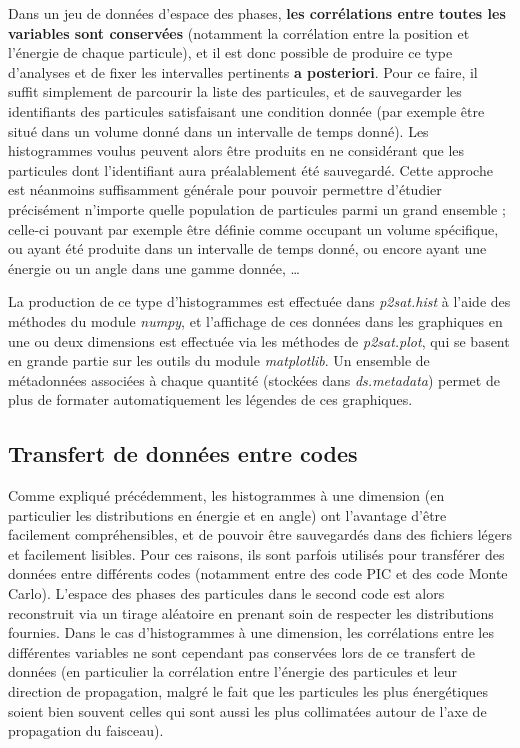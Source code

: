 \begin{refsection}
Dans un jeu de données d'espace des phases, \textbf{les corrélations entre toutes les variables sont conservées} (notamment la corrélation entre la position et l'énergie de chaque particule), et il est donc possible de produire ce type d'analyses et de fixer les intervalles pertinents \textbf{a posteriori}. Pour ce faire, il suffit simplement de parcourir la liste des particules, et de sauvegarder les identifiants des particules satisfaisant une condition donnée (par exemple être situé dans un volume donné dans un intervalle de temps donné). Les histogrammes voulus peuvent alors être produits en ne considérant que les particules dont l'identifiant aura préalablement été sauvegardé. Cette approche est néanmoins suffisamment générale pour pouvoir permettre d'étudier précisément n'importe quelle population de particules parmi un grand ensemble ; celle-ci pouvant par exemple être définie comme occupant un volume spécifique, ou ayant été produite dans un intervalle de temps donné, ou encore ayant une énergie ou un angle dans une gamme donnée, … 

La production de ce type d'histogrammes est effectuée dans \textit{p2sat.hist} à l'aide des méthodes du module \textit{numpy}, et l'affichage de ces données dans les graphiques en une ou deux dimensions est effectuée via les méthodes de \textit{p2sat.plot}, qui se basent en grande partie sur les outils du module \textit{matplotlib}. Un ensemble de métadonnées associées à chaque quantité (stockées dans \textit{ds.metadata}) permet de plus de formater automatiquement les légendes de ces graphiques.

\subsection{Transfert de données entre codes}

Comme expliqué précédemment, les histogrammes à une dimension (en particulier les distributions en énergie et en angle) ont l'avantage d'être facilement compréhensibles, et de pouvoir être sauvegardés dans des fichiers légers et facilement lisibles. Pour ces raisons, ils sont parfois utilisés pour transférer des données entre différents codes (notamment entre des code PIC et des code Monte Carlo). L'espace des phases des particules dans le second code est alors reconstruit via un tirage aléatoire en prenant soin de respecter les distributions fournies. Dans le cas d'histogrammes à une dimension, les corrélations entre les différentes variables ne sont cependant pas conservées lors de ce transfert de données (en particulier la corrélation entre l'énergie des particules et leur direction de propagation, malgré le fait que les particules les plus énergétiques soient bien souvent celles qui sont aussi les plus collimatées autour de l'axe de propagation du faisceau).


\end{refsection}

